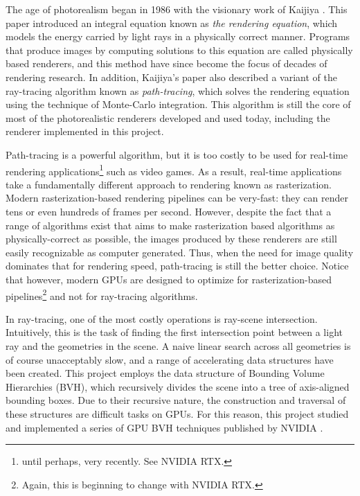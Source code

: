 The age of photorealism began in 1986 with the visionary work of Kaijiya \cite{rendering_equation}. This paper introduced an integral equation known as \textit{the rendering equation}, which models the energy carried by light rays in a physically correct manner. Programs that produce images by computing solutions to this equation are called physically based renderers, and this method have since become the focus of decades of rendering research. In addition, Kaijiya's paper also described a variant of the ray-tracing algorithm known as \textit{path-tracing}, which solves the rendering equation using the technique of Monte-Carlo integration. This algorithm is still the core of most of the photorealistic renderers developed and used today, including the renderer implemented in this project.

Path-tracing is a powerful algorithm, but it is too costly to be used for real-time rendering applications\footnote{until perhaps, very recently. See NVIDIA RTX.} such as video games. As a result, real-time applications take a fundamentally different approach to rendering known as rasterization. Modern rasterization-based rendering pipelines can be very-fast: they can render tens or even hundreds of frames per second. However, despite the fact that a range of algorithms \cite{fernando2005percentage,sloan2002precomputed,hanrahan1991rapid} exist that aims to make rasterization based algorithms as physically-correct as possible, the images produced by these renderers are still easily recognizable as computer generated. Thus, when the need for image quality dominates that for rendering speed, path-tracing is still the better choice. Notice that however, modern GPUs are designed to optimize for rasterization-based pipelines\footnote{Again, this is beginning to change with NVIDIA RTX.} and not for ray-tracing algorithms. 

In ray-tracing, one of the most costly operations is ray-scene intersection. Intuitively, this is the task of finding the first intersection point between a light ray and the geometries in the scene. A naive linear search across all geometries is of course unacceptably slow, and a range of accelerating data structures have been created. This project employs the data structure of Bounding Volume Hierarchies (BVH), which recursively divides the scene into a tree of axis-aligned bounding boxes. Due to their recursive nature, the construction and traversal of these structures are difficult tasks on GPUs. For this reason, this project studied and implemented a series of GPU BVH techniques published by NVIDIA \cite{bvh_build,bvh_optimize,bvh_traversal}.


